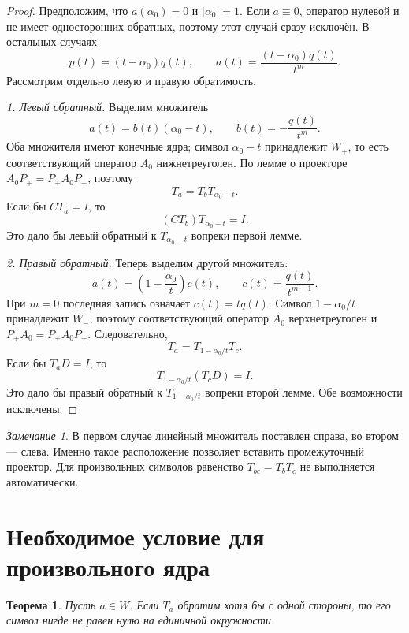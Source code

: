 \documentclass[12pt,a4paper]{article}
\newtheorem{theorem}{Теорема}
\theoremstyle{definition}
\theoremstyle{remark}
\newtheorem*{remark}{Замечание}
\begin{document}
\begin{proof}
Предположим, что $a(\alpha_0)=0$ и $|\alpha_0|=1$.
Если $a\equiv0$, оператор нулевой и не имеет односторонних обратных,
поэтому этот случай сразу исключён. В остальных случаях
\[
  p(t)=(t-\alpha_0)q(t),\qquad
  a(t)=\frac{(t-\alpha_0)q(t)}{t^m}.
\]
Рассмотрим отдельно левую и правую обратимость.

\emph{1. Левый обратный.} Выделим множитель
\[
  a(t)=b(t)(\alpha_0-t),\qquad b(t)=-\frac{q(t)}{t^m}.
\]
Оба множителя имеют конечные ядра; символ $\alpha_0-t$ принадлежит
$W_+$, то есть соответствующий оператор $A_0$ нижнетреуголен.
По лемме о проекторе $A_0P_+=P_+A_0P_+$, поэтому
\[
  T_a=T_bT_{\alpha_0-t}.
\]
Если бы $CT_a=I$, то
\[
  (CT_b)T_{\alpha_0-t}=I.
\]
Это дало бы левый обратный к $T_{\alpha_0-t}$ вопреки первой лемме.

\emph{2. Правый обратный.} Теперь выделим другой множитель:
\[
  a(t)=\left(1-\frac{\alpha_0}{t}\right)c(t),\qquad
  c(t)=\frac{q(t)}{t^{m-1}}.
\]
При $m=0$ последняя запись означает $c(t)=tq(t)$.
Символ $1-\alpha_0/t$ принадлежит $W_-$, поэтому соответствующий
оператор $A_0$ верхнетреуголен и $P_+A_0=P_+A_0P_+$.
Следовательно,
\[
  T_a=T_{1-\alpha_0/t}T_c.
\]
Если бы $T_aD=I$, то
\[
  T_{1-\alpha_0/t}(T_cD)=I.
\]
Это дало бы правый обратный к $T_{1-\alpha_0/t}$ вопреки второй лемме.
Обе возможности исключены.
\end{proof}

\begin{remark}
В первом случае линейный множитель поставлен справа, во втором ---
слева. Именно такое расположение позволяет вставить промежуточный
проектор. Для произвольных символов равенство $T_{bc}=T_bT_c$
не выполняется автоматически.
\end{remark}

\section{Необходимое условие для произвольного ядра}

\begin{theorem}
Пусть $a\in W$. Если $T_a$ обратим хотя бы с одной стороны,
то его символ нигде не равен нулю на единичной окружности.
\end{theorem}
\end{document}
